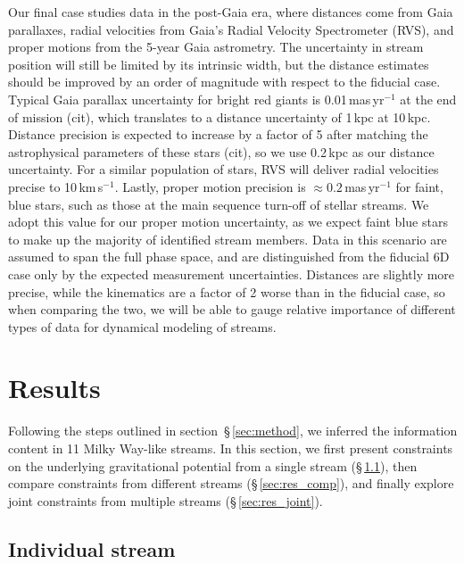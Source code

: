\documentclass[modern]{aastex61}
\begin{document}
Our final case studies data in the post-Gaia era, where distances come from Gaia parallaxes, radial velocities from Gaia's Radial Velocity Spectrometer (RVS), and proper motions from the 5-year Gaia astrometry.
The uncertainty in stream position will still be limited by its intrinsic width, but the distance estimates should be improved by an order of magnitude with respect to the fiducial case.
Typical Gaia parallax uncertainty for bright red giants is 0.01\,mas\,yr$^{-1}$ at the end of mission (cit), which translates to a distance uncertainty of 1\,kpc at 10\,kpc.
Distance precision is expected to increase by a factor of 5 after matching the astrophysical parameters of these stars (cit), so we use 0.2\,kpc as our distance uncertainty.
For a similar population of stars, RVS will deliver radial velocities precise to 10\,km\,s$^{-1}$.
Lastly, proper motion precision is $\approx0.2$\,mas\,yr$^{-1}$ for faint, blue stars, such as those at the main sequence turn-off of stellar streams.
We adopt this value for our proper motion uncertainty, as we expect faint blue stars to make up the majority of identified stream members.
Data in this scenario are assumed to span the full phase space, and are distinguished from the fiducial 6D case only by the expected measurement uncertainties.
Distances are slightly more precise, while the kinematics are a factor of 2 worse than in the fiducial case, so when comparing the two, we will be able to gauge relative importance of different types of data for dynamical modeling of streams.


\section{Results}
\label{sec:results}
Following the steps outlined in section~\S\,\ref{sec:method}, we inferred the information content in 11 Milky Way-like streams.
In this section, we first present constraints on the underlying gravitational potential from a single stream (\S\,\ref{sec:res_ind}), then compare constraints from different streams (\S\,\ref{sec:res_comp}), and finally explore joint constraints from multiple streams (\S\,\ref{sec:res_joint}).

\subsection{Individual stream}
\label{sec:res_ind}
\end{document}

